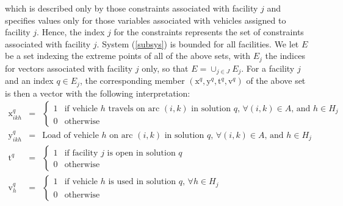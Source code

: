 which is described only by those constraints associated with facility
$j$ and specifies values only for those variables associated with
vehicles assigned to facility $j$. Hence, the index $j$ for the
constraints represents the set of constraints associated with facility
$j$. System (\ref{subsys}) is bounded for all facilities.
We let $E$ be a set indexing the extreme points %
of all of the above sets,
with $E_j$ the indices for vectors associated with facility $j$ only,
so that $E = \cup_{j \in J} E_j$. For a facility $j$ and an index $q
\in E_j$, the corresponding member $(\mbox{x}^q, \mbox{y}^q,
\mbox{t}^q,\mbox{v}^q)$ of the above set is then a vector with the following
interpretation: 
\begin{eqnarray*}
\mbox{x}_{ikh}^q & = & \left \{ \begin{array}{ll}
                 1  & \mbox{if vehicle $h$ travels on arc $(i,k)$ in solution 
		   $q$, $\forall (i, k) \in A$, and $h \in H_j$}\\
                 0  & \mbox{otherwise}                                                  
                \end{array}
       \right. \\
\mbox{y}_{ikh}^q & = & \mbox{Load of vehicle $h$ on arc $(i,k)$ in solution 
		   $q$, $\forall (i, k) \in A$, and $h \in H_j$ }\\ 
\mbox{t}^q & = & \left \{ \begin{array}{ll}
                 1  & \mbox{if facility $j$ is open in solution $q$ }\\
                 0  & \mbox{otherwise}                                                  
                \end{array}
       \right.\\
\mbox{v}_{h}^q & = & \left \{ \begin{array}{ll}
                 1  & \mbox{if vehicle $h$ is used in solution $q$, $\forall h \in H_j$}\\
                 0  & \mbox{otherwise}                                                  
                \end{array}
       \right. 
\end{eqnarray*}

